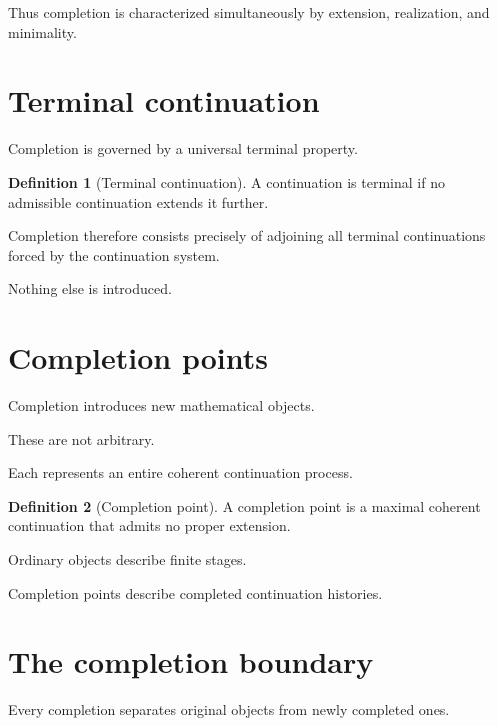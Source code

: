 \documentclass[13pt,openany]{book}
\theoremstyle{plain}
\theoremstyle{definition}
\newtheorem{definition}{Definition}[chapter]
\begin{document}
Thus completion is characterized simultaneously by extension,
realization, and minimality.

\section{Terminal continuation}

Completion is governed by a universal terminal property.

\begin{definition}[Terminal continuation]
A continuation is terminal if no admissible continuation extends it further.
\end{definition}

Completion therefore consists precisely of adjoining all terminal continuations
forced by the continuation system.

Nothing else is introduced.

\section{Completion points}

Completion introduces new mathematical objects.

These are not arbitrary.

Each represents an entire coherent continuation process.

\begin{definition}[Completion point]
A completion point is a maximal coherent continuation that admits no proper
extension.
\end{definition}

Ordinary objects describe finite stages.

Completion points describe completed continuation histories.

\section{The completion boundary}

Every completion separates original objects from newly completed ones.
\end{document}

